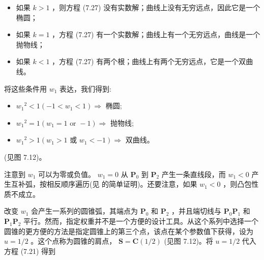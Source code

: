 \documentclass[../main.tex]{subfiles}
\begin{document}
\begin{itemize}
\item 如果 \(k > 1\) ，则方程 (7.27) 没有实数解；曲线上没有无穷远点，因此它是一个椭圆；
\end{itemize}

\begin{itemize}
\item 如果 \(k = 1\) ，方程 (7.27) 有一个实数解；曲线上有一个无穷远点，曲线是一个抛物线；
\end{itemize}

\begin{itemize}
\item 如果 \(k < 1\) ，方程 (7.27) 有两个根；曲线上有两个无穷远点，它是一个双曲线。
\end{itemize}

将这些条件用 \({w}_{1}\) 表达，我们得到:

\begin{itemize}
\item \({w}_{1}{}^{2} < 1\left( {-1 < {w}_{1} < 1}\right)  \Rightarrow\) 椭圆;
\end{itemize}

\begin{itemize}
\item \({w}_{1}{}^{2} = 1\left( {{w}_{1} = 1\text{ or } - 1}\right)  \Rightarrow\) 抛物线;
\end{itemize}

\begin{itemize}
\item \({w}_{1}{}^{2} > 1\left( {{w}_{1} > 1}\right.\) 或 \(\left. {{w}_{1} <  - 1}\right)  \Rightarrow\) 双曲线。
\end{itemize}

(见图 7.12)。

注意到 \({w}_{1}\) 可以为零或负值。 \({w}_{1} = 0\) 从 \({\mathbf{P}}_{0}\) 到 \({\mathbf{P}}_{2}\) 产生一条直线段，而 \({w}_{1} < 0\) 产生互补弧，按相反顺序遍历(见 \cite{Lee87} 的简单证明)。还要注意，如果 \({w}_{1} < 0\) ，则凸包性质不成立。

改变 \({w}_{1}\) 会产生一系列的圆锥弧，其端点为 \({\mathbf{P}}_{0}\) 和 \({\mathbf{P}}_{2}\) ，并且端切线与 \({\mathbf{P}}_{0}{\mathbf{P}}_{1}\) 和 \({\mathbf{P}}_{1}{\mathbf{P}}_{2}\) 平行。然而，指定权重并不是一个方便的设计工具。从这个系列中选择一个圆锥的更方便的方法是指定圆锥上的第三个点，该点在某个参数值下获得，设为 \(u = 1/2\) 。这个点称为圆锥的肩点， \(\mathbf{S} = \mathbf{C}\left( {1/2}\right)\) (见图 7.12)。将 \(u = 1/2\) 代入方程 (7.21) 得到
\end{document}
